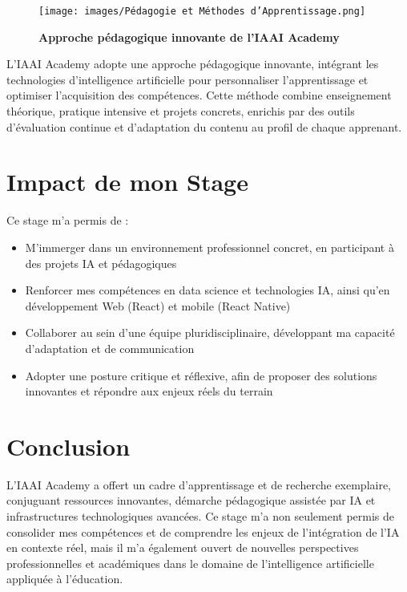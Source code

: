 \begin{figure}[H]
  \centering
  \texttt{[image: images/Pédagogie et Méthodes d'Apprentissage.png]}
  \caption{\textbf{Approche pédagogique innovante de l'IAAI Academy}}
  \label{fig:pedagogie}
\end{figure}

L'IAAI Academy adopte une approche pédagogique innovante, intégrant les technologies d'intelligence artificielle pour personnaliser l'apprentissage et optimiser l'acquisition des compétences. Cette méthode combine enseignement théorique, pratique intensive et projets concrets, enrichis par des outils d'évaluation continue et d'adaptation du contenu au profil de chaque apprenant.

\section{Impact de mon Stage}

Ce stage m'a permis de :
\begin{itemize}
  \item M'immerger dans un environnement professionnel concret, en participant à des projets IA et pédagogiques
  \item Renforcer mes compétences en data science et technologies IA, ainsi qu'en développement Web (React) et mobile (React Native)
  \item Collaborer au sein d'une équipe pluridisciplinaire, développant ma capacité d'adaptation et de communication
  \item Adopter une posture critique et réflexive, afin de proposer des solutions innovantes et répondre aux enjeux réels du terrain
\end{itemize}

\section{Conclusion}

L'IAAI Academy a offert un cadre d'apprentissage et de recherche exemplaire, conjuguant ressources innovantes, démarche pédagogique assistée par IA et infrastructures technologiques avancées. Ce stage m'a non seulement permis de consolider mes compétences et de comprendre les enjeux de l'intégration de l'IA en contexte réel, mais il m'a également ouvert de nouvelles perspectives professionnelles et académiques dans le domaine de l'intelligence artificielle appliquée à l'éducation. 